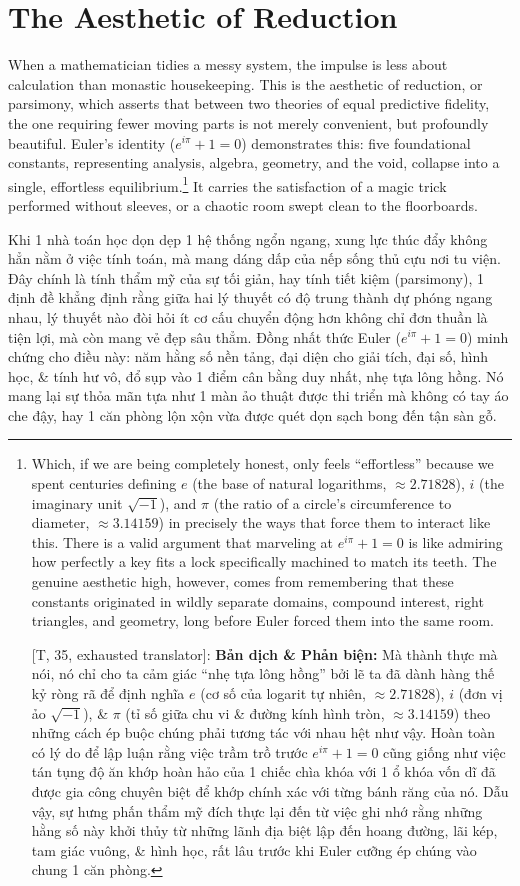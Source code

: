 \documentclass[11pt]{article}
\begin{document}
\section{The Aesthetic of Reduction}
When a mathematician tidies a messy system, the impulse is less about calculation than monastic housekeeping. This is the aesthetic of reduction, or parsimony, which asserts that between two theories of equal predictive fidelity, the one requiring fewer moving parts is not merely convenient, but profoundly beautiful. Euler's identity ($e^{i\pi} + 1 = 0$) demonstrates this: five foundational constants, representing analysis, algebra, geometry, and the void, collapse into a single, effortless equilibrium.\footnote{Which, if we are being completely honest, only feels ``effortless'' because we spent centuries defining $e$ (the base of natural logarithms, $\approx 2.71828$), $i$ (the imaginary unit $\sqrt{-1}$), and $\pi$ (the ratio of a circle's circumference to diameter, $\approx 3.14159$) in precisely the ways that force them to interact like this. There is a valid argument that marveling at $e^{i\pi} + 1 = 0$ is like admiring how perfectly a key fits a lock specifically machined to match its teeth. The genuine aesthetic high, however, comes from remembering that these constants originated in wildly separate domains, compound interest, right triangles, and geometry, long before Euler forced them into the same room.
	
	\textsf{[T, 35, exhausted translator]:} \textbf{Bản dịch \& Phản biện:} Mà thành thực mà nói, nó chỉ cho ta cảm giác ``nhẹ tựa lông hồng'' bởi lẽ ta đã dành hàng thế kỷ ròng rã để định nghĩa $e$ (cơ số của logarit tự nhiên, $\approx 2.71828$), $i$ (đơn vị ảo $\sqrt{-1}$), \& $\pi$ (tỉ số giữa chu vi \& đường kính hình tròn, $\approx 3.14159$) theo những cách ép buộc chúng phải tương tác với nhau hệt như vậy. Hoàn toàn có lý do để lập luận rằng việc trầm trồ trước $e^{i\pi} + 1 = 0$ cũng giống như việc tán tụng độ ăn khớp hoàn hảo của 1 chiếc chìa khóa với 1 ổ khóa vốn dĩ đã được gia công chuyên biệt để khớp chính xác với từng bánh răng của nó. Dẫu vậy, sự hưng phấn thẩm mỹ đích thực lại đến từ việc ghi nhớ rằng những hằng số này khởi thủy từ những lãnh địa biệt lập đến hoang đường, lãi kép, tam giác vuông, \& hình học, rất lâu trước khi Euler cưỡng ép chúng vào chung 1 căn phòng.} It carries the satisfaction of a magic trick performed without sleeves, or a chaotic room swept clean to the floorboards.

Khi 1 nhà toán học dọn dẹp 1 hệ thống ngổn ngang, xung lực thúc đẩy không hẳn nằm ở việc tính toán, mà mang dáng dấp của nếp sống thủ cựu nơi tu viện. Đây chính là tính thẩm mỹ của sự tối giản, hay tính tiết kiệm (parsimony), 1 định đề khẳng định rằng giữa hai lý thuyết có độ trung thành dự phóng ngang nhau, lý thuyết nào đòi hỏi ít cơ cấu chuyển động hơn không chỉ đơn thuần là tiện lợi, mà còn mang vẻ đẹp sâu thẳm. Đồng nhất thức Euler ($e^{i\pi} + 1 = 0$) minh chứng cho điều này: năm hằng số nền tảng, đại diện cho giải tích, đại số, hình học, \& tính hư vô, đổ sụp vào 1 điểm cân bằng duy nhất, nhẹ tựa lông hồng. Nó mang lại sự thỏa mãn tựa như 1 màn ảo thuật được thi triển mà không có tay áo che đậy, hay 1 căn phòng lộn xộn vừa được quét dọn sạch bong đến tận sàn gỗ.
\end{document}
